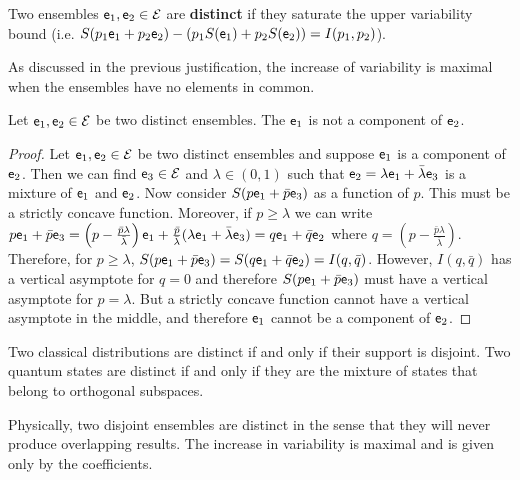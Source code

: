 \begin{defn}
	Two ensembles $\mathsf{e}_1, \mathsf{e}_2 \in \mathcal{E}$ are \textbf{distinct} if they saturate the upper variability bound (i.e. $S(p_1\mathsf{e}_1 + p_2 \mathsf{e}_2) - (p_1 S(\mathsf{e}_1) + p_2 S(\mathsf{e}_2)) = I(p_1, p_2)$).
\end{defn}

\begin{justification}
	As discussed in the previous justification, the increase of variability is maximal when the ensembles have no elements in common.
\end{justification}

\begin{prop}
	Let $\mathsf{e}_1, \mathsf{e}_2 \in \mathcal{E}$ be two distinct ensembles. The $\mathsf{e}_1$ is not a component of $\mathsf{e}_2$.
\end{prop}

\begin{proof}
	Let $\mathsf{e}_1, \mathsf{e}_2 \in \mathcal{E}$ be two distinct ensembles and suppose $\mathsf{e}_1$ is a component of $\mathsf{e}_2$. Then we can find $\mathsf{e}_3 \in \mathcal{E}$ and $\lambda \in (0,1)$ such that $\mathsf{e}_2 = \lambda \mathsf{e}_1 + \bar{\lambda} \mathsf{e}_3$ is a mixture of $\mathsf{e}_1$ and $\mathsf{e}_2$. Now consider $S(p \mathsf{e}_1 + \bar{p} \mathsf{e}_3)$ as a function of $p$. This must be a strictly concave function. Moreover, if $p \geq \lambda$ we can write $p \mathsf{e}_1 + \bar{p} \mathsf{e}_3 = \left(p - \frac{\bar{p} \lambda}{\bar{\lambda}}\right) \mathsf{e}_1 + \frac{\bar{p}}{\bar{\lambda}} (\lambda \mathsf{e}_1 + \bar{\lambda} \mathsf{e}_3) = q \mathsf{e}_1 + \bar{q} \mathsf{e}_2$ where $q = \left(p - \frac{\bar{p} \lambda}{\bar{\lambda}}\right)$. Therefore, for $p \geq \lambda$, $S(p \mathsf{e}_1 + \bar{p} \mathsf{e}_3) = S(q \mathsf{e}_1 + \bar{q} \mathsf{e}_2)  = I(q,\bar{q})$. However, $I(q,\bar{q})$ has a vertical asymptote for $q=0$ and therefore $S(p \mathsf{e}_1 + \bar{p} \mathsf{e}_3)$ must have a vertical asymptote for $p=\lambda$. But a strictly concave function cannot have a vertical asymptote in the middle, and therefore $\mathsf{e}_1$ cannot be a component of $\mathsf{e}_2$.
\end{proof}

\begin{remark}
	Two classical distributions are distinct if and only if their support is disjoint. Two quantum states are distinct if and only if they are the mixture of states that belong to orthogonal subspaces.
	
	Physically, two disjoint ensembles are distinct in the sense that they will never produce overlapping results. The increase in variability is maximal and is given only by the coefficients.
\end{remark}

